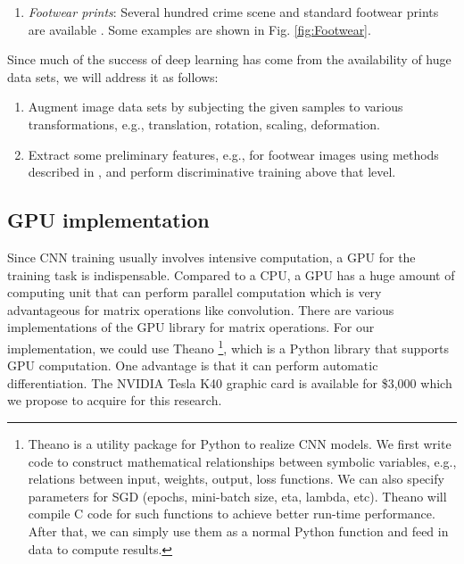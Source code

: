 \documentclass[11pt, doublespacing]{article}
\begin{document}
\begin{enumerate}
%


\item {\em Footwear prints}: Several hundred crime scene and standard footwear prints are available \cite{Srihari2011a}.  Some examples are shown in Fig.  \ref{fig:Footwear}.
\end{enumerate}
Since much of the success of deep learning has come from the availability of huge data sets, we will address it as follows:
\begin{enumerate}
\item Augment image data sets by subjecting the given samples to various transformations, e.g., translation, rotation, scaling, deformation.
\item Extract some preliminary features, e.g., for footwear images using methods described in \cite{Srihari2011a},  and perform discriminative training above that level.
\end{enumerate}

 \subsection{GPU implementation}
 Since CNN training usually involves intensive computation, a GPU for the training task is indispensable. Compared to a CPU, a GPU has a
huge amount of computing unit that can perform parallel computation which is very advantageous for matrix operations like convolution.
There are various implementations of the GPU library for matrix operations. For our implementation, we could use Theano
\footnote{Theano is a utility package for Python  to realize CNN models. We first write code to construct mathematical relationships between symbolic variables, e.g., relations between input, weights, output, loss functions. We can also specify parameters for SGD (epochs, mini-batch size, eta, lambda, etc).  Theano will compile C code for such functions to achieve better run-time performance. After that, we can simply use them as a normal Python function and feed in data to compute results.}, 
which is a Python library that supports GPU computation. One advantage is that it can perform automatic differentiation.
The NVIDIA Tesla K40 graphic card is available for {\$}3,000 which we propose to acquire for this research.
\end{document}
